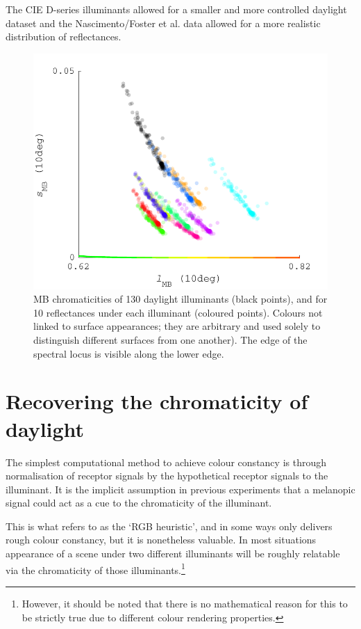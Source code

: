 The CIE D-series illuminants allowed for a smaller and more controlled daylight dataset and the Nascimento/Foster et al. data allowed for a more realistic distribution of reflectances.

\begin{figure}[htbp]
    \includegraphics[max width=\textwidth]{figs/comp/predictingChromaticity/BasicMB_2.pdf}
    \caption{\gls{MB} chromaticities of 130 daylight illuminants (black points), and for 10 reflectances under each illuminant (coloured points). Colours not linked to surface appearances; they are arbitrary and used solely to distinguish different surfaces from one another). The edge of the spectral locus is visible along the lower edge.}
    \label{fig:MB}
\end{figure} 


\section{Recovering the chromaticity of daylight}

The simplest computational method to achieve colour constancy is through normalisation of receptor signals by the hypothetical receptor signals to the illuminant. It is the implicit assumption in previous experiments that a melanopic signal could act as a cue to the chromaticity of the illuminant.

This is what \citet{maloney_physics-based_2001} refers to as the `RGB heuristic', and in some ways only delivers rough colour constancy, but it is nonetheless valuable. In most situations appearance of a scene under two different illuminants will be roughly relatable via the chromaticity of those illuminants.\footnote{However, it should be noted that there is no mathematical reason for this to be strictly true due to different colour rendering properties.}


